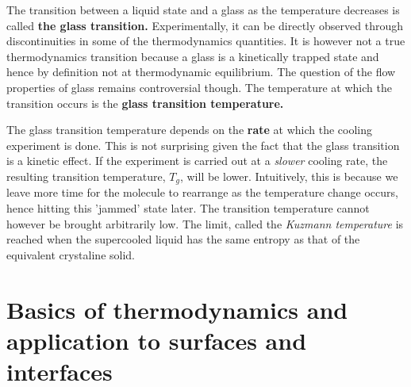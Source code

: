 \documentclass[a4paper, 11pt, normalem]{report}
\begin{document}
The transition between a liquid state and a glass as the temperature decreases is called \textbf{the glass transition.}
Experimentally, it can be directly observed through discontinuities in some of the thermodynamics quantities.
It is however not a true thermodynamics transition because a glass is a kinetically trapped state and hence by definition not at thermodynamic equilibrium.
The question of the flow properties of glass remains controversial though.
The temperature at which the transition occurs is the \textbf{glass transition temperature.}
\begin{figure}[H]
    \centering
\end{figure}
The glass transition temperature depends on the \textbf{rate} at which the cooling experiment is done.
This is not surprising given the fact that the glass transition is a kinetic effect.
If the experiment is carried out at a \textit{slower} cooling rate, the resulting transition temperature, $T_g$, will be lower.
Intuitively, this is because we leave more time for the molecule to rearrange as the temperature change occurs, hence hitting this 'jammed' state later.
The transition temperature cannot however be brought arbitrarily low.
The limit, called the \textit{Kuzmann temperature} is reached when the supercooled liquid has the same entropy as that of the equivalent crystaline solid.

\chapter{Basics of thermodynamics and application to surfaces and interfaces}
\end{document}
